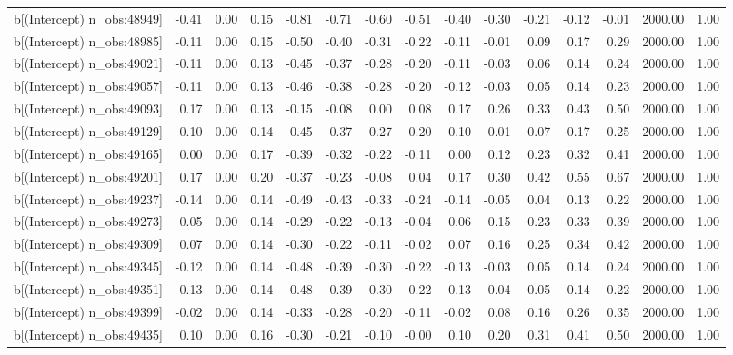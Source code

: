 \begin{table}[ht]
\begin{tabular}{rrrrrrrrrrrrrrr}
  b[(Intercept) n\_obs:48949] & -0.41 & 0.00 & 0.15 & -0.81 & -0.71 & -0.60 & -0.51 & -0.40 & -0.30 & -0.21 & -0.12 & -0.01 & 2000.00 & 1.00 \\ 
  b[(Intercept) n\_obs:48985] & -0.11 & 0.00 & 0.15 & -0.50 & -0.40 & -0.31 & -0.22 & -0.11 & -0.01 & 0.09 & 0.17 & 0.29 & 2000.00 & 1.00 \\ 
  b[(Intercept) n\_obs:49021] & -0.11 & 0.00 & 0.13 & -0.45 & -0.37 & -0.28 & -0.20 & -0.11 & -0.03 & 0.06 & 0.14 & 0.24 & 2000.00 & 1.00 \\ 
  b[(Intercept) n\_obs:49057] & -0.11 & 0.00 & 0.13 & -0.46 & -0.38 & -0.28 & -0.20 & -0.12 & -0.03 & 0.05 & 0.14 & 0.23 & 2000.00 & 1.00 \\ 
  b[(Intercept) n\_obs:49093] & 0.17 & 0.00 & 0.13 & -0.15 & -0.08 & 0.00 & 0.08 & 0.17 & 0.26 & 0.33 & 0.43 & 0.50 & 2000.00 & 1.00 \\ 
  b[(Intercept) n\_obs:49129] & -0.10 & 0.00 & 0.14 & -0.45 & -0.37 & -0.27 & -0.20 & -0.10 & -0.01 & 0.07 & 0.17 & 0.25 & 2000.00 & 1.00 \\ 
  b[(Intercept) n\_obs:49165] & 0.00 & 0.00 & 0.17 & -0.39 & -0.32 & -0.22 & -0.11 & 0.00 & 0.12 & 0.23 & 0.32 & 0.41 & 2000.00 & 1.00 \\ 
  b[(Intercept) n\_obs:49201] & 0.17 & 0.00 & 0.20 & -0.37 & -0.23 & -0.08 & 0.04 & 0.17 & 0.30 & 0.42 & 0.55 & 0.67 & 2000.00 & 1.00 \\ 
  b[(Intercept) n\_obs:49237] & -0.14 & 0.00 & 0.14 & -0.49 & -0.43 & -0.33 & -0.24 & -0.14 & -0.05 & 0.04 & 0.13 & 0.22 & 2000.00 & 1.00 \\ 
  b[(Intercept) n\_obs:49273] & 0.05 & 0.00 & 0.14 & -0.29 & -0.22 & -0.13 & -0.04 & 0.06 & 0.15 & 0.23 & 0.33 & 0.39 & 2000.00 & 1.00 \\ 
  b[(Intercept) n\_obs:49309] & 0.07 & 0.00 & 0.14 & -0.30 & -0.22 & -0.11 & -0.02 & 0.07 & 0.16 & 0.25 & 0.34 & 0.42 & 2000.00 & 1.00 \\ 
  b[(Intercept) n\_obs:49345] & -0.12 & 0.00 & 0.14 & -0.48 & -0.39 & -0.30 & -0.22 & -0.13 & -0.03 & 0.05 & 0.14 & 0.24 & 2000.00 & 1.00 \\ 
  b[(Intercept) n\_obs:49351] & -0.13 & 0.00 & 0.14 & -0.48 & -0.39 & -0.30 & -0.22 & -0.13 & -0.04 & 0.05 & 0.14 & 0.22 & 2000.00 & 1.00 \\ 
  b[(Intercept) n\_obs:49399] & -0.02 & 0.00 & 0.14 & -0.33 & -0.28 & -0.20 & -0.11 & -0.02 & 0.08 & 0.16 & 0.26 & 0.35 & 2000.00 & 1.00 \\ 
  b[(Intercept) n\_obs:49435] & 0.10 & 0.00 & 0.16 & -0.30 & -0.21 & -0.10 & -0.00 & 0.10 & 0.20 & 0.31 & 0.41 & 0.50 & 2000.00 & 1.00 \\ 

\end{tabular}
\end{table}
